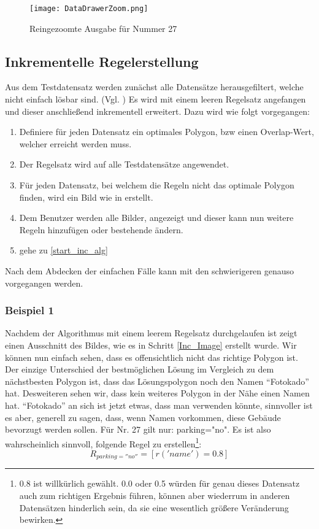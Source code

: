 \begin{figure}
 \centering
 \texttt{[image: DataDrawerZoom.png]}
 \caption{Reingezoomte Ausgabe für Nummer 27}
 \label{fig:DataDrawerZoom}
\end{figure}

\subsection{Inkrementelle Regelerstellung}
Aus dem Testdatensatz werden zunächst alle Datensätze herausgefiltert, welche nicht einfach lösbar sind.
(Vgl. )
Es wird mit einem leeren Regelsatz angefangen und dieser anschließend inkrementell erweitert. Dazu wird wie folgt vorgegangen:
\begin{enumerate}
\itemsep-2pt
\item Definiere für jeden Datensatz ein optimales Polygon, bzw einen Overlap-Wert, welcher erreicht werden muss.
\item Der Regelsatz wird auf alle Testdatensätze angewendet. \label{start_inc_alg}
\item Für jeden Datensatz, bei welchem die Regeln nicht das optimale Polygon finden, wird ein Bild wie in  erstellt. \label{Inc_Image}
\item Dem Benutzer werden alle Bilder, angezeigt und dieser kann nun weitere Regeln hinzufügen oder bestehende ändern.
\item gehe zu \ref{start_inc_alg}
\end{enumerate}

Nach dem Abdecken der einfachen Fälle kann mit den schwierigeren genauso vorgegangen werden.

\subsubsection{Beispiel 1}
Nachdem der Algorithmus mit einem leerem Regelsatz durchgelaufen ist zeigt
 einen Ausschnitt des Bildes, wie es in Schritt \ref{Inc_Image} erstellt wurde. Wir können nun einfach sehen,
dass es offensichtlich nicht das richtige Polygon ist. Der einzige Unterschied der bestmöglichen Lösung im Vergleich zu dem nächstbesten Polygon ist,
dass das Lösungspolygon noch den Namen ``Fotokado'' hat. Desweiteren sehen wir, dass kein weiteres Polygon in der Nähe einen Namen hat.
``Fotokado'' an sich ist jetzt etwas, dass man verwenden könnte, sinnvoller ist es aber, generell zu sagen, dass, wenn Namen vorkommen, diese Gebäude
bevorzugt werden sollen. Für Nr. 27 gilt nur: parking="no". Es ist also wahrscheinlich sinnvoll, folgende Regel zu erstellen\footnote{0.8 ist willkürlich gewählt.
0.0 oder 0.5 würden für genau dieses Datensatz auch zum richtigen Ergebnis führen, können aber wiederrum in anderen Datensätzen hinderlich sein,
da sie eine wesentlich größere Veränderung bewirken.}:
\begin{equation*}
R_{parking=''no''} = [r('name') = 0.8]
\end{equation*}

